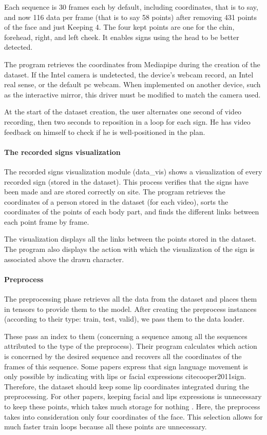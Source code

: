 Each sequence is 30 frames each by default, including coordinates, that is to say, and now 116 data per frame (that is to say 58 points) after removing 431 points of the face and just Keeping 4. The four kept points are one for the chin, forehead, right, and left cheek.
It enables signs using the head to be better detected.

The program retrieves the coordinates from Mediapipe during the creation of the dataset. If the Intel camera is undetected, the device's webcam record, an Intel real sense, or the default pc webcam. When implemented on another device, such as the interactive mirror, this driver must be modified to match the camera used.

At the start of the dataset creation, the user alternates one second of video recording, then two seconds to reposition in a loop for each sign. He has video feedback on himself to check if he is well-positioned in the plan.

\paragraph{The recorded signs visualization}

The recorded signs visualization module (data\_vis) shows a visualization of every recorded sign (stored in the dataset). This process verifies that the signs have been made and are stored correctly on site.
The program retrieves the coordinates of a person stored in the dataset (for each video), sorts the coordinates of the points of each body part, and finds the different links between each point frame by frame. 

The visualization displays all the links between the points stored in the dataset. The program also displays the action with which the visualization of the sign is associated above the drawn character.

\paragraph{Preprocess}

The preprocessing phase retrieves all the data from the dataset and places them in tensors to provide them to the model.
After creating the preprocess instances (according to their type: train, test, valid), we pass them to the data loader. 

These pass an index to them (concerning a sequence among all the sequences attributed to the type of the preprocess). Their program calculates which action is concerned by the desired sequence and recovers all the coordinates of the frames of this sequence. 
Some papers express that sign language movement is only possible by indicating with lips or facial expressions cite{cooper2011sign}. Therefore, the dataset should keep some lip coordinates integrated during the preprocessing. For other papers, keeping facial and lips expressions is unnecessary to keep these points, which takes much storage for nothing \cite{dreuw2007speech}. Here, the preprocess takes into consideration only four coordinates of the face. This selection allows for much faster train loops because all these points are unnecessary.

